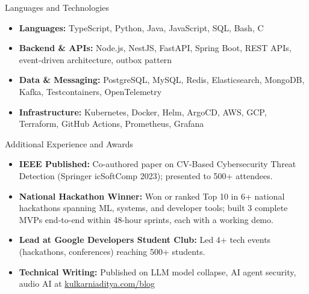 \documentclass[]{mcdowellcv}
\begin{document}
\begin{cvsection}{Languages and Technologies}
  \begin{cvsubsection}{}{}{}
    \begin{itemize}
      \item \textbf{Languages:} TypeScript, Python, Java, JavaScript, SQL, Bash, C
      \item \textbf{Backend \& APIs:} Node.js, NestJS, FastAPI, Spring Boot, REST APIs, event-driven architecture, outbox pattern
      \item \textbf{Data \& Messaging:} PostgreSQL, MySQL, Redis, Elasticsearch, MongoDB, Kafka, Testcontainers, OpenTelemetry
      \item \textbf{Infrastructure:} Kubernetes, Docker, Helm, ArgoCD, AWS, GCP, Terraform, GitHub Actions, Prometheus, Grafana
    \end{itemize}
  \end{cvsubsection}
\end{cvsection}

\begin{cvsection}{Additional Experience and Awards}
  \begin{cvsubsection}{}{}{}
    \begin{itemize}
      \item \textbf{IEEE Published:} Co-authored paper on CV-Based Cybersecurity Threat Detection (Springer icSoftComp 2023); presented to 500+ attendees.
      \item \textbf{National Hackathon Winner:} Won or ranked Top 10 in 6+ national hackathons spanning ML, systems, and developer tools; built 3 complete MVPs end-to-end within 48-hour sprints, each with a working demo.
      \item \textbf{Lead at Google Developers Student Club:} Led 4+ tech events (hackathons, conferences) reaching 500+ students.
      \item \textbf{Technical Writing:} Published on LLM model collapse, AI agent security, audio AI at \href{https://www.kulkarniaditya.com/blog}{kulkarniaditya.com/blog}
    \end{itemize}
  \end{cvsubsection}
\end{cvsection}
\end{document}
